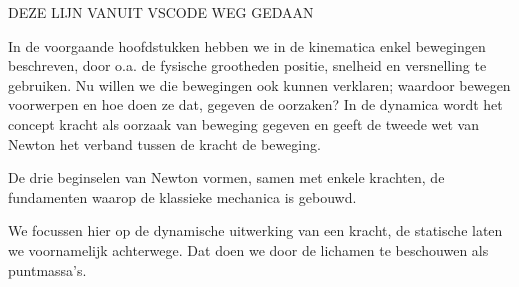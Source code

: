 \documentclass{ximera}
\begin{document}
	\author{Bart Lambregs}
    \xmsource\xmuitleg


DEZE LIJN VANUIT VSCODE WEG GEDAAN 


In de voorgaande hoofdstukken hebben we in de kinematica enkel bewegingen beschreven, door o.a. de fysische grootheden positie, snelheid en versnelling te gebruiken. Nu willen we die bewegingen ook kunnen verklaren; waardoor bewegen voorwerpen en hoe doen ze dat, gegeven de oorzaken? In de dynamica wordt het concept kracht als oorzaak van beweging gegeven en geeft de tweede wet van Newton het verband tussen de kracht de beweging.

De drie beginselen van Newton vormen, samen met enkele krachten, de fundamenten waarop de klassieke mechanica is gebouwd.

We focussen hier op de dynamische uitwerking van een kracht, de statische laten we voornamelijk achterwege. Dat doen we door de lichamen te beschouwen als puntmassa's.
\end{document}
